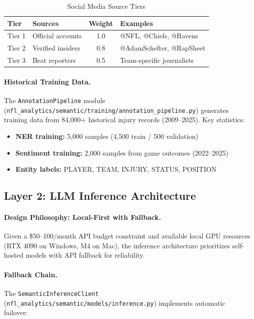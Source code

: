 \begin{table}[htbp]
\centering
\caption{Social Media Source Tiers}
\label{tab:social-tiers}
\small
\begin{tabular}{@{} l l S[table-format=1.1] l @{}}
\toprule
\textbf{Tier} & \textbf{Sources} & \textbf{Weight} & \textbf{Examples} \\
\midrule
Tier 1 & Official accounts & 1.0 & @NFL, @Chiefs, @Ravens \\
Tier 2 & Verified insiders & 0.8 & @AdamSchefter, @RapSheet \\
Tier 3 & Beat reporters & 0.5 & Team-specific journalists \\
\bottomrule
\end{tabular}
\end{table}

\paragraph{Historical Training Data.}
The \texttt{AnnotationPipeline} module (\texttt{nfl\_analytics/semantic/\allowbreak training/\allowbreak annotation\_pipeline.py}) generates training data from 84,000+ historical injury records (2009--2025). Key statistics:

\begin{itemize}[itemsep=2pt,parsep=0pt]
    \item \textbf{NER training:} 5,000 samples (4,500 train / 500 validation)
    \item \textbf{Sentiment training:} 2,000 samples from game outcomes (2022--2025)
    \item \textbf{Entity labels:} PLAYER, TEAM, INJURY, STATUS, POSITION
\end{itemize}

\subsection{Layer 2: LLM Inference Architecture}

\paragraph{Design Philosophy: Local-First with Fallback.}
Given a \$50--100/month API budget constraint and available local GPU resources (RTX 4090 on Windows, M4 on Mac), the inference architecture prioritizes self-hosted models with API fallback for reliability.

\paragraph{Fallback Chain.}
The \texttt{SemanticInferenceClient} (\texttt{nfl\_analytics/semantic/\allowbreak models/\allowbreak inference.py}) implements automatic failover:

